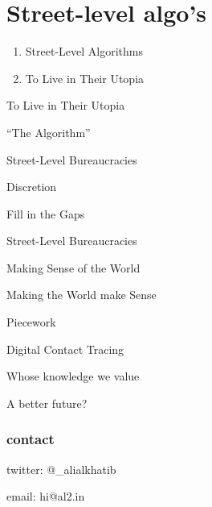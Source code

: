 \documentclass[aspectratio=43,17pt]{beamer} %
\newcommand{\onlyinsubfile}[1]{#1}
\newcommand{\notinsubfile}[1]{}
\begin{document}
\renewcommand{\onlyinsubfile}[1]{}
\renewcommand{\notinsubfile}[1]{#1}




\section{Street-level algo's}

\begin{frame}[plain]
\begin{enumerate}
  \item<+-> Street-Level Algorithms
  \item<+-> To Live in Their Utopia
\end{enumerate}
\end{frame}

\begin{frame}[standout]
To Live in Their Utopia
\end{frame}

\begin{frame}[standout]
``The Algorithm''
\end{frame}

\begin{frame}[standout]
Street-Level Bureaucracies
\end{frame}


\begin{frame}[standout]
Discretion
\end{frame}


\begin{frame}[standout]
Fill in the Gaps
\end{frame}


\begin{frame}[standout]
Street-Level Bureaucracies
\end{frame}


\begin{frame}[standout]
Making \alert{Sense} of the {World}
\end{frame}


\begin{frame}[standout]
Making the \alert{World} make {Sense}
\end{frame}

\begin{frame}[standout]
Piecework
\end{frame}

\begin{frame}[standout]
Digital Contact Tracing
\end{frame}

\begin{frame}[standout]
\alert{Whose} knowledge we value
\end{frame}


\begin{frame}[standout]
A better future?
\end{frame}


\begin{frame}\frametitle{contact}

{\LARGE
twitter: @\_alialkhatib

\vspace{2em}

email: hi@al2.in
}

\end{frame}
\end{document}
